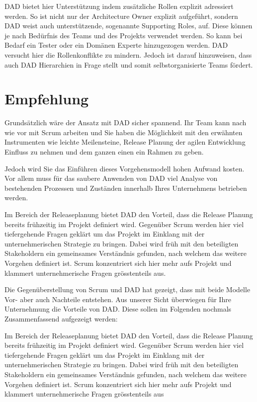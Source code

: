DAD bietet hier Unterstützung indem zusätzliche Rollen explizit adressiert werden. So ist nicht nur der Architecture Owner explizit aufgeführt, sondern DAD weist auch unterstützende, sogenannte Supporting Roles, auf. Diese können je nach Bedürfnis des Teams und des Projekts verwendet werden. So kann bei Bedarf ein Tester oder ein Domänen Experte hinzugezogen werden. DAD versucht hier die Rollenkonflikte zu mindern. Jedoch ist darauf hinzuweisen, dass auch DAD Hierarchien in Frage stellt und somit selbstorganisierte Teams fördert.



\section{Empfehlung}

Grundsätzlich wäre der Ansatz mit DAD sicher spannend. Ihr Team kann nach wie vor mit Scrum arbeiten und Sie haben die Möglichkeit mit den erwähnten Instrumenten wie leichte Meilensteine, Release Planung der agilen Entwicklung Einfluss zu nehmen und dem ganzen einen ein Rahmen zu geben.

Jedoch wird Sie das Einführen dieses Vorgehensmodell hohen Aufwand kosten. Vor allem muss für das saubere Anwenden von DAD viel Analyse von bestehenden Prozessen und Zuständen innerhalb Ihres Unternehmens betrieben werden.

Im Bereich der Releaseplanung bietet DAD den Vorteil, dass die Release Planung bereits frühzeitig im Projekt definiert wird. Gegenüber Scrum werden hier viel tiefergehende Fragen geklärt um das Projekt im Einklang mit der unternehmerischen Strategie zu bringen. Dabei wird früh mit den beteiligten Stakeholdern ein gemeinsames Verständnis gefunden, nach welchem das weitere Vorgehen definiert ist. Scrum konzentriert sich hier mehr aufs Projekt und klammert unternehmerische Fragen grösstenteils aus.

Die Gegenüberstellung von Scrum und DAD hat gezeigt, dass mit beide Modelle Vor- aber auch Nachteile entstehen. Aus unserer Sicht überwiegen für Ihre Unternehmung die Vorteile von DAD. Diese sollen im Folgenden nochmals Zusammenfassend aufgezeigt werden:

Im Bereich der Releaseplanung bietet DAD den Vorteil, dass die Release Planung bereits frühzeitig im Projekt definiert wird. Gegenüber Scrum werden hier viel tiefergehende Fragen geklärt um das Projekt im Einklang mit der unternehmerischen Strategie zu bringen. Dabei wird früh mit den beteiligten Stakeholdern ein gemeinsames Verständnis gefunden, nach welchem das weitere Vorgehen definiert ist. Scrum konzentriert sich hier mehr aufs Projekt und klammert unternehmerische Fragen grösstenteils aus\newline

